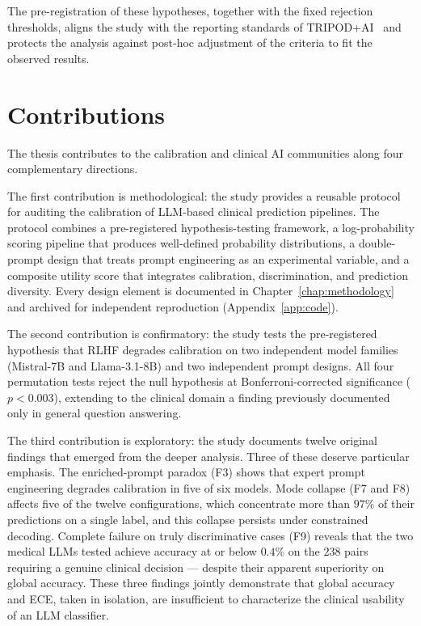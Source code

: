 The pre-registration of these hypotheses, together with the fixed 
rejection thresholds, aligns the study with the reporting standards of 
TRIPOD+AI~\cite{collins2024tripod} and protects the analysis against 
post-hoc adjustment of the criteria to fit the observed results.

\section{Contributions}
\label{sec:intro-contributions}

The thesis contributes to the calibration and clinical AI communities 
along four complementary directions.

The first contribution is methodological: the study provides a 
reusable protocol for auditing the calibration of LLM-based clinical 
prediction pipelines. The protocol combines a pre-registered 
hypothesis-testing framework, a log-probability scoring pipeline that 
produces well-defined probability distributions, a double-prompt 
design that treats prompt engineering as an experimental variable, and 
a composite utility score that integrates calibration, discrimination, 
and prediction diversity. Every design element is documented in 
Chapter~\ref{chap:methodology} and archived for independent 
reproduction (Appendix~\ref{app:code}).

The second contribution is confirmatory: the study tests the 
pre-registered hypothesis that RLHF degrades calibration on two 
independent model families (Mistral-7B and Llama-3.1-8B) and two 
independent prompt designs. All four permutation tests reject the null 
hypothesis at Bonferroni-corrected significance ($p < 0.003$), 
extending to the clinical domain a finding previously documented only 
in general question answering.

The third contribution is exploratory: the study documents twelve 
original findings that emerged from the deeper analysis. Three of 
these deserve particular emphasis. The enriched-prompt paradox (F3) 
shows that expert prompt engineering degrades calibration in five of 
six models. Mode collapse (F7 and F8) affects five of the twelve 
configurations, which concentrate more than $97\%$ of their 
predictions on a single label, and this collapse persists under 
constrained decoding. Complete failure on truly discriminative cases 
(F9) reveals that the two medical LLMs tested achieve accuracy at or 
below $0.4\%$ on the $238$ pairs requiring a genuine clinical decision 
--- despite their apparent superiority on global accuracy. These 
three findings jointly demonstrate that global accuracy and ECE, 
taken in isolation, are insufficient to characterize the clinical 
usability of an LLM classifier.


